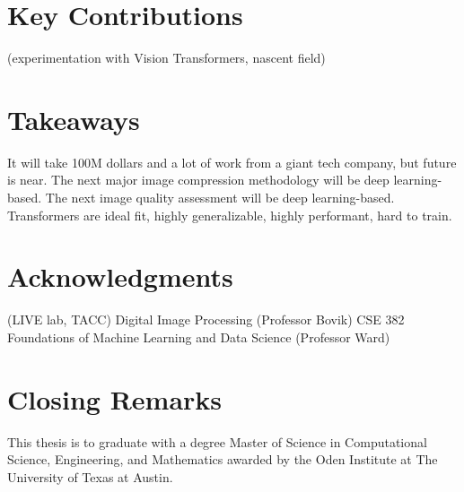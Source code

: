 \section{Key Contributions}

(experimentation with Vision Transformers, nascent field)

\newpage
\section{Takeaways}

It will take 100M dollars and a lot of work from a giant tech company, but
future is near. The next major image compression methodology will be deep learning-based.
The next image quality assessment will be deep learning-based.
Transformers are ideal fit, highly generalizable, highly performant, hard to train.


\section{Acknowledgments}

(LIVE lab, TACC)
Digital Image Processing (Professor Bovik)
CSE 382 Foundations of Machine Learning and Data Science (Professor Ward)

\section{Closing Remarks}

This thesis is to graduate with a degree Master of Science in Computational Science, 
Engineering, and Mathematics awarded by the Oden Institute at 
The University of Texas at Austin.